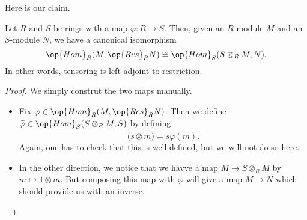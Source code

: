 Here is our claim.
\begin{proposition}
	Let $R$ and $S$ be rings with a map $\varphi:R\to S$. Then, given an $R$-module $M$ and an $S$-module $N$, we have a canonical isomorphism
	\[\op{Hom}_R(M,\op{Res}_RN)\cong\op{Hom}_S(S\otimes_RM,N).\]
	In other words, tensoring is left-adjoint to restriction.
\end{proposition}
\begin{proof}
	We simply construt the two maps manually.
	\begin{itemize}
		\item Fix $\varphi\in\op{Hom}_R(M,\op{Res}_RN)$. Then we define $\widetilde\varphi\in\op{Hom}_S(S\otimes_RM,S)$ by defining
		\[\widetilde(s\otimes m)=s\varphi(m).\]
		Again, one has to check that this is well-defined, but we will not do so here.

		\item In the other direction, we notice that we havve a map $M\to S\otimes_RM$ by $m\mapsto 1\otimes m$. But composing this map with $\widetilde\varphi$ will give a map $M\to N$ which should provide us with an inverse.
		\qedhere
	\end{itemize}
\end{proof}

